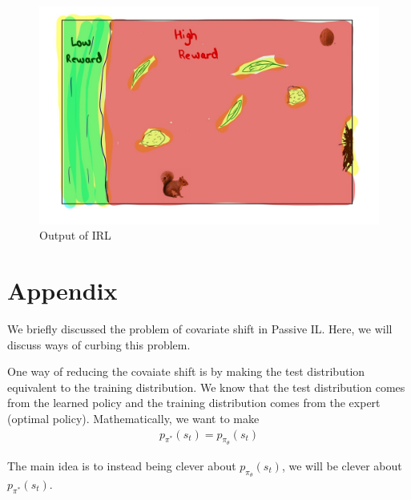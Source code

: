 \documentclass[11pt]{article}
\begin{document}
\begin{figure}[H]
\centering
\includegraphics[width=0.8\linewidth]{figs/IMG_0212.JPG}
\caption{Output of IRL}
\label{fig:output}
\end{figure}

{


}

\section{Appendix}

We briefly discussed the problem of covariate shift in Passive IL. Here, we will discuss ways of curbing this problem. 

One way of reducing the covaiate shift is by making the test distribution equivalent to the training distribution. We know that the test distribution comes from the learned policy and the training distribution comes from the expert (optimal policy). Mathematically, we want to make
\begin{align*}
    p_{\pi^{*}}(s_t) = p_{\pi_\theta}(s_t)
\end{align*}

The main idea is to instead being clever about $p_{\pi_\theta}(s_t)$, we will be clever about $p_{\pi^{*}}(s_t)$.
\end{document}
